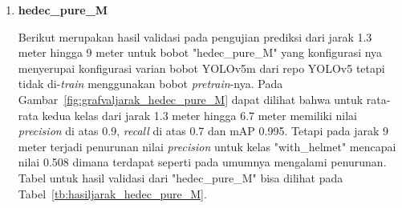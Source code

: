 \begin{enumerate}
  \FloatBarrier

  \item \textbf{hedec\_pure\_M}
  
  \par Berikut merupakan hasil validasi pada pengujian prediksi dari jarak 1.3 meter hingga 9 meter untuk bobot "hedec\_pure\_M"
  yang konfigurasi nya menyerupai konfigurasi varian bobot YOLOv5m dari repo YOLOv5 tetapi tidak di-\emph{train} menggunakan bobot \emph{pretrain}-nya.
  Pada Gambar~\ref{fig:grafvaljarak_hedec_pure_M} dapat dilihat bahwa untuk rata-rata kedua kelas dari jarak 1.3 meter hingga 6.7 meter
  memiliki nilai \emph{precision} di atas 0.9, \emph{recall} di atas 0.7 dan mAP 0.995. Tetapi pada jarak 9 meter terjadi penurunan
  nilai \emph{precision} untuk kelas "with\_helmet" mencapai nilai 0.508 dimana terdapat seperti pada umumnya mengalami penurunan. 
  Tabel untuk hasil validasi dari "hedec\_pure\_M" bisa dilihat
  pada Tabel~\ref{tb:hasiljarak_hedec_pure_M}.
  

\end{enumerate}

